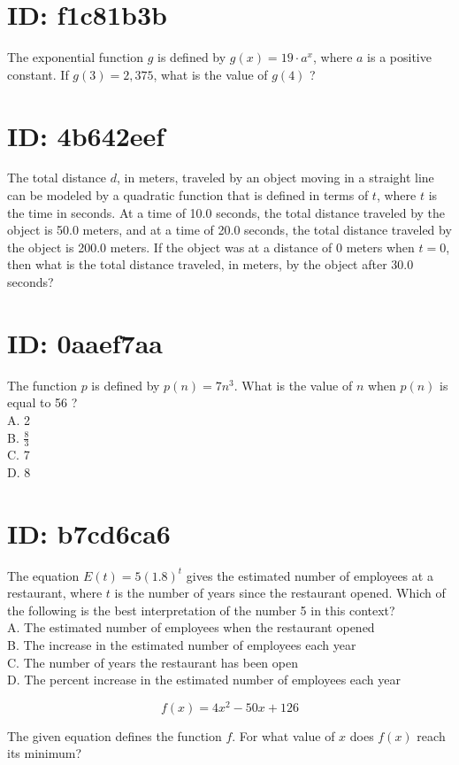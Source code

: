 \section*{ID: f1c81b3b}
The exponential function $g$ is defined by $g(x)=19 \cdot a^{x}$, where $a$ is a positive constant. If $g(3)=2,375$, what is the value of $g(4)$ ?

\section*{ID: 4b642eef}
The total distance $d$, in meters, traveled by an object moving in a straight line can be modeled by a quadratic function that is defined in terms of $t$, where $t$ is the time in seconds. At a time of 10.0 seconds, the total distance traveled by the object is 50.0 meters, and at a time of 20.0 seconds, the total distance traveled by the object is 200.0 meters. If the object was at a distance of 0 meters when $t=0$, then what is the total distance traveled, in meters, by the object after 30.0 seconds?

\section*{ID: 0aaef7aa}
The function $p$ is defined by $p(n)=7 n^{3}$. What is the value of $n$ when $p(n)$ is equal to 56 ?\\
A. 2\\
B. $\frac{8}{3}$\\
C. 7\\
D. 8

\section*{ID: b7cd6ca6}
The equation $E(t)=5(1.8)^{t}$ gives the estimated number of employees at a restaurant, where $t$ is the number of years since the restaurant opened. Which of the following is the best interpretation of the number 5 in this context?\\
A. The estimated number of employees when the restaurant opened\\
B. The increase in the estimated number of employees each year\\
C. The number of years the restaurant has been open\\
D. The percent increase in the estimated number of employees each year

$$
f(x)=4 x^{2}-50 x+126
$$

The given equation defines the function $f$. For what value of $x$ does $f(x)$ reach its minimum?

